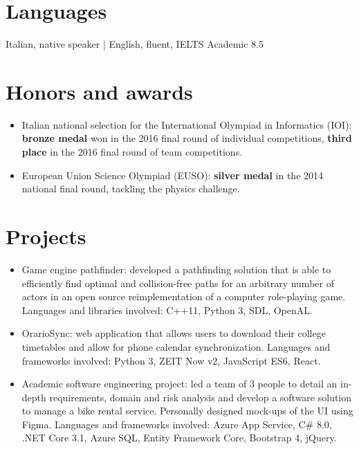 \documentclass[10pt, a4paper]{article}
\begin{document}
\section*{Languages}
Italian, native speaker | English, fluent, IELTS Academic 8.5
\section*{Honors and awards}
\begin{itemize}
\item Italian national selection for the International Olympiad in Informatics (IOI): \textbf{bronze medal} won in the 2016 final round of individual competitions, \textbf{third place} in the 2016 final round of team competitions.
\item European Union Science Olympiad (EUSO): \textbf{silver medal} in the 2014 national final round, tackling the physics challenge. 
\end{itemize}

\section*{Projects}
\begin{itemize}
\item Game engine pathfinder: developed a pathfinding solution that is able to efficiently find optimal and collision-free paths for an arbitrary number of actors in an open source reimplementation of a computer role-playing game. Languages and libraries involved: C++11, Python 3, SDL, OpenAL.

\item OrarioSync: web application that allows users to download their college timetables and allow for phone calendar synchronization. Languages and frameworks involved: Python 3, ZEIT Now v2, JavaScript ES6, React.

\item Academic software engineering project: led a team of 3 people to detail an in-depth requirements, domain and risk analysis and develop a software solution to manage a bike rental service. Personally designed mock-ups of the UI using Figma. Languages and frameworks involved: Azure App Service, C\# 8.0, .NET Core 3.1, Azure SQL, Entity Framework Core, Bootstrap 4, jQuery.

\end{itemize}
\nocite{*}

\end{document}

